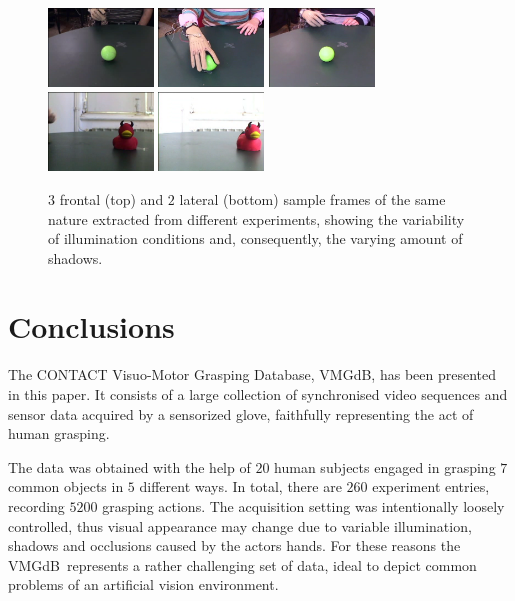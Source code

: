 \documentclass{article}
\newcommand{\db}{\textsf{VMGdB}}
\begin{document}
\begin{figure}[!ht]
	\centering
	\includegraphics[height=2.1cm]{images/light1}
	\includegraphics[height=2.1cm]{images/light2}
	\includegraphics[height=2.1cm]{images/light3}\\
	\includegraphics[height=2.1cm]{images/lightB1}
	\includegraphics[height=2.1cm]{images/lightB2}
	\caption{$3$ frontal (top) and $2$ lateral (bottom) sample frames of the
	  same nature extracted from different experiments, showing the variability
	  of illumination conditions and, consequently, the varying amount of shadows.}
	\label{fig::light_variations}
\end{figure}

\section{Conclusions}

The CONTACT Visuo-Motor Grasping Database, \db, has been presented in this paper.
It consists of a large collection of synchronised video sequences and sensor
data acquired by a sensorized glove, faithfully representing the act of human grasping. 

The data was obtained with the help of $20$ human subjects engaged in grasping $7$
common objects in $5$ different ways. In total, there are $260$ experiment entries,
recording $5200$ grasping actions. The acquisition setting was intentionally loosely
controlled, thus visual appearance may change due to variable illumination, shadows
and occlusions caused by the actors hands. For these reasons the \db\ represents a
rather challenging set of data, ideal to depict common problems of an artificial
vision environment. 
\end{document}
